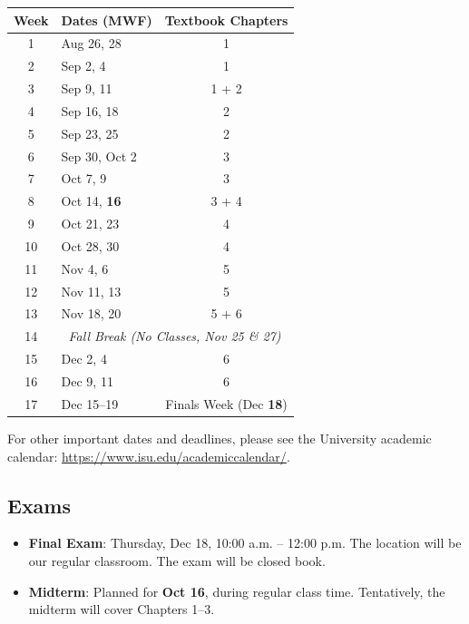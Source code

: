 \documentclass[11pt]{article}\usepackage[]{graphicx}\usepackage[]{xcolor}
\begin{document}
\begin{longtable}{|c|l|c|}
\hline
\textbf{Week} & \textbf{Dates (MWF)} & \textbf{Textbook Chapters} \\
\hline
\endhead

1 & Aug 26, 28     & 1\\\hline
2 & Sep 2, 4       & 1\\\hline
3 & Sep 9, 11      & 1 + 2\\\hline
4 & Sep 16, 18     & 2 \\\hline
5 & Sep 23, 25     & 2 \\\hline
6 & Sep 30, Oct 2  & 3 \\\hline
7 & Oct 7, 9       & 3 \\\hline
8 & Oct 14, {\color{blue} \textbf{16}} & 3 + 4\\\hline
9 & Oct 21, 23     &  4 \\\hline
10 & Oct 28, 30    &  4 \\\hline
11 & Nov 4, 6      &  5 \\\hline
12 & Nov 11, 13    &  5 \\\hline
13 & Nov 18, 20    &  5 + 6\\\hline
14 & \multicolumn{2}{|c|}{\textit{Fall Break (No Classes, Nov 25 \& 27)}} \\\hline
15 & Dec 2, 4      &  6 \\\hline
16 & Dec 9, 11     &  6 \\\hline
17 & Dec 15--19 & Finals Week ({\color{blue}Dec \textbf{18}}) \\ \hline

\end{longtable}


For other important dates and deadlines, please see the University academic calendar: \url{https://www.isu.edu/academiccalendar/}.

\subsection{Exams}

\begin{itemize}
  \item \textbf{Final Exam}: Thursday, Dec 18, 10:00 a.m. -- 12:00 p.m. The location will be our regular classroom. The exam will be closed book.
  \item \textbf{Midterm}: Planned for {\color{blue} \textbf{Oct 16}}, during regular class time. Tentatively, the midterm will cover Chapters 1--3.
\end{itemize}
\end{document}
